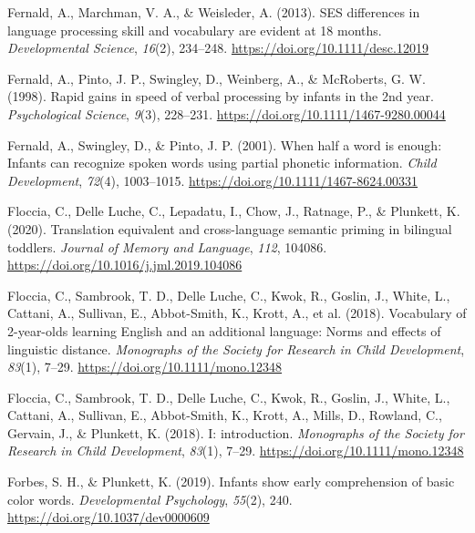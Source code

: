 \documentclass[
  12pt,
  b5paperpaper,
  twoside]{scrreprt}
\newlength{\cslhangindent}
\newlength{\cslentryspacingunit} %
\newenvironment{CSLReferences}[2] %
 {%
  \setlength{\parindent}{0pt}
  \ifodd #1
  \let\oldpar\par
  \def\par{\hangindent=\cslhangindent\oldpar}
  \fi
  \setlength{\parskip}{#2\cslentryspacingunit}
 }%
 {}
\begin{document}
\begin{CSLReferences}{1}{0}
\leavevmode{}%
Fernald, A., Marchman, V. A., \& Weisleder, A. (2013). {SES} differences
in language processing skill and vocabulary are evident at 18 months.
\emph{Developmental Science}, \emph{16}(2), 234--248.
\url{https://doi.org/10.1111/desc.12019}

\leavevmode{}%
Fernald, A., Pinto, J. P., Swingley, D., Weinberg, A., \& McRoberts, G.
W. (1998). Rapid gains in speed of verbal processing by infants in the
2nd year. \emph{Psychological Science}, \emph{9}(3), 228--231.
\url{https://doi.org/10.1111/1467-9280.00044}

\leavevmode{}%
Fernald, A., Swingley, D., \& Pinto, J. P. (2001). When half a word is
enough: Infants can recognize spoken words using partial phonetic
information. \emph{Child Development}, \emph{72}(4), 1003--1015.
\url{https://doi.org/10.1111/1467-8624.00331}

\leavevmode{}%
Floccia, C., Delle Luche, C., Lepadatu, I., Chow, J., Ratnage, P., \&
Plunkett, K. (2020). Translation equivalent and cross-language semantic
priming in bilingual toddlers. \emph{Journal of Memory and Language},
\emph{112}, 104086. \url{https://doi.org/10.1016/j.jml.2019.104086}

\leavevmode{}%
Floccia, C., Sambrook, T. D., Delle Luche, C., Kwok, R., Goslin, J.,
White, L., Cattani, A., Sullivan, E., Abbot-Smith, K., Krott, A., et al.
(2018). Vocabulary of 2-year-olds learning {English} and an additional
language: Norms and effects of linguistic distance. \emph{Monographs of
the Society for Research in Child Development}, \emph{83}(1), 7--29.
\url{https://doi.org/10.1111/mono.12348}

\leavevmode{}%
Floccia, C., Sambrook, T. D., Delle Luche, C., Kwok, R., Goslin, J.,
White, L., Cattani, A., Sullivan, E., Abbot-Smith, K., Krott, A., Mills,
D., Rowland, C., Gervain, J., \& Plunkett, K. (2018). I: introduction.
\emph{Monographs of the Society for Research in Child Development},
\emph{83}(1), 7--29. \url{https://doi.org/10.1111/mono.12348}

\leavevmode{}%
Forbes, S. H., \& Plunkett, K. (2019). Infants show early comprehension
of basic color words. \emph{Developmental Psychology}, \emph{55}(2),
240. \url{https://doi.org/10.1037/dev0000609}


\end{CSLReferences}
\end{document}
